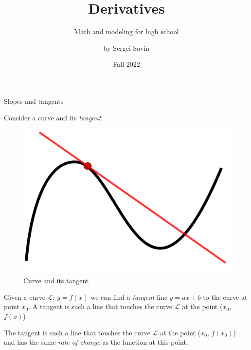 \documentclass{beamer}
\title{Derivatives}
\subtitle{Math and modeling for high school}
\author{by Sergei Savin}
\date{Fall 2022}
\begin{document}
\maketitle


%
%



\begin{frame}{Slopes and tangents}
	\begin{flushleft}
		
		Consider a curve and its \emph{tangent}:
		
		\begin{figure}
			\centering
			\includegraphics[width=0.4\linewidth]{tangent_to_curve}
			\caption{Curve and its tangent}
			\label{fig:tangenttocurve}
		\end{figure}
		
		Given a curve $\mathscr{L}$: $y = f(x)$ we can find a \emph{tangent} line $y = ax + b$ to the curve at point $x_0$. A tangent is such a line that touches the curve $\mathscr{L}$ at the point ($x_0$, $f(x)$) 
		
		\bigskip
		
		The tangent is such a line that touches the curve $\mathscr{L}$ at the point  ($x_0$, $f(x_0)$) and has the same \emph{rate of change} as the function at this point.
		
	\end{flushleft}
\end{frame}
\end{document}
